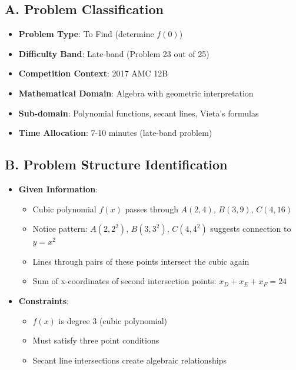 \documentclass[]{article}
\begin{document}
\begin{problemconfigbox}
\subsection*{A. Problem Classification}
\begin{itemize}[leftmargin=*]
    \item \textbf{Problem Type}: To Find (determine $f(0)$)
    \item \textbf{Difficulty Band}: Late-band (Problem 23 out of 25)
    \item \textbf{Competition Context}: 2017 AMC 12B
    \item \textbf{Mathematical Domain}: Algebra with geometric interpretation
    \item \textbf{Sub-domain}: Polynomial functions, secant lines, Vieta's formulas
    \item \textbf{Time Allocation}: 7-10 minutes (late-band problem)
\end{itemize}

\subsection*{B. Problem Structure Identification}
\begin{itemize}[leftmargin=*]
    \item \textbf{Given Information}:
    \begin{itemize}
        \item Cubic polynomial $f(x)$ passes through $A(2,4)$, $B(3,9)$, $C(4,16)$
        \item Notice pattern: $A(2, 2^2)$, $B(3, 3^2)$, $C(4, 4^2)$ suggests connection to $y = x^2$
        \item Lines through pairs of these points intersect the cubic again
        \item Sum of x-coordinates of second intersection points: $x_D + x_E + x_F = 24$
    \end{itemize}
    
    \item \textbf{Constraints}: 
    \begin{itemize}
        \item $f(x)$ is degree 3 (cubic polynomial)
        \item Must satisfy three point conditions
        \item Secant line intersections create algebraic relationships
    \end{itemize}
    

\end{itemize}
\end{problemconfigbox}
\end{document}

